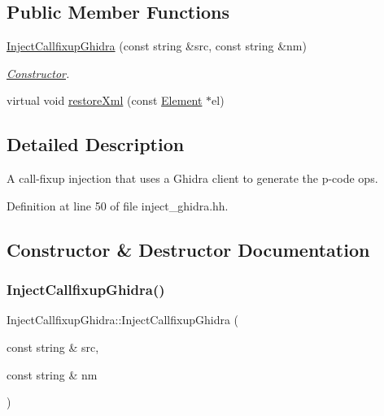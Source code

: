 \subsection*{Public Member Functions}
\begin{DoxyCompactItemize}
\item 
\mbox{\hyperlink{class_inject_callfixup_ghidra_a5dc537228622d6417a667e78067b5851}{Inject\+Callfixup\+Ghidra}} (const string \&src, const string \&nm)
\begin{DoxyCompactList}\small\item\em \mbox{\hyperlink{class_constructor}{Constructor}}. \end{DoxyCompactList}\item 
virtual void \mbox{\hyperlink{class_inject_callfixup_ghidra_aa37f8393c5bd7ca6ef68220b278acd19}{restore\+Xml}} (const \mbox{\hyperlink{class_element}{Element}} $\ast$el)
\end{DoxyCompactItemize}


\subsection{Detailed Description}
A call-\/fixup injection that uses a Ghidra client to generate the p-\/code ops. 

Definition at line 50 of file inject\+\_\+ghidra.\+hh.



\subsection{Constructor \& Destructor Documentation}
\mbox{\label{class_inject_callfixup_ghidra_a5dc537228622d6417a667e78067b5851}} 
\subsubsection{\texorpdfstring{InjectCallfixupGhidra()}{InjectCallfixupGhidra()}}
{\footnotesize\ttfamily Inject\+Callfixup\+Ghidra\+::\+Inject\+Callfixup\+Ghidra (\begin{DoxyParamCaption}\item[{const string \&}]{src,  }\item[{const string \&}]{nm }\end{DoxyParamCaption})}




